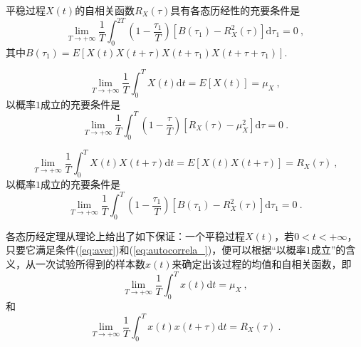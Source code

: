 \documentclass[12pt,a4paper]{article}
\newcommand{\dif}{\mathrm{d}}
\begin{document}
\begin{tcolorbox}[colback=green!5,colframe=green!40!black,title= 自相关函数各态历经定理]
平稳过程$X(t)$的自相关函数$R_X(\tau)$具有各态历经性的充要条件是
\begin{equation}
\lim_{T\rightarrow +\infty} \dfrac{1}{T} \int_0^{2T} \left(1 -\dfrac{\tau_1}{T} \right)  [B(\tau_1) - R_X^2(\tau) ] \dif \tau_1 = 0 ~,
\label{eq:autocorrela}
\end{equation}
其中$B(\tau_1) = E[X(t) X(t+\tau) X(t+\tau_1) X(t+\tau+\tau_1)]$. 
\end{tcolorbox}

\begin{tcolorbox}[colback=green!5,colframe=green!40!black,title= 定理三]
\begin{equation*}
\lim_{T\rightarrow +\infty} \dfrac{1}{T} \int_0^{T} X(t) \dif t = E[X(t)] = \mu_X ~,
\end{equation*}
以概率$1$成立的充要条件是
\begin{equation}
\lim_{T\rightarrow +\infty} \dfrac{1}{T} \int_0^{T} \left(1 -\dfrac{\tau}{T} \right)  [R_X(\tau) - \mu_X^2 ] \dif \tau = 0 ~.
\label{eq:aver}
\end{equation}
\end{tcolorbox}


\begin{tcolorbox}[colback=green!5,colframe=green!40!black,title= 定理四]
\begin{equation*}
\lim_{T\rightarrow +\infty} \dfrac{1}{T} \int_0^{T} X(t)X(t+\tau) \dif t = E[X(t)X(t+\tau)] = R_X(\tau) ~,
\end{equation*}
以概率$1$成立的充要条件是
\begin{equation}
\lim_{T\rightarrow +\infty} \dfrac{1}{T} \int_0^{T} \left(1 -\dfrac{\tau_1}{T} \right)  [B(\tau_1) - R_X^2(\tau) ] \dif \tau_1 = 0 ~.
\label{eq:autocorrela_}
\end{equation}
\end{tcolorbox}

各态历经定理从理论上给出了如下保证：一个平稳过程$X(t)$，若$0<t< +\infty$，只要它满足条件(\ref{eq:aver})和(\ref{eq:autocorrela_})，便可以根据“以概率$1$成立”的含义，从一次试验所得到的样本数$x(t)$来确定出该过程的均值和自相关函数，即
\begin{equation}
\lim_{T\rightarrow +\infty} \dfrac{1}{T} \int_0^{T} x(t) \dif t = \mu_X ~,
\end{equation}
和
\begin{equation}
\lim_{T\rightarrow +\infty} \dfrac{1}{T} \int_0^{T} x(t)x(t+\tau) \dif t = R_X(\tau) ~.
\end{equation}
\end{document}
